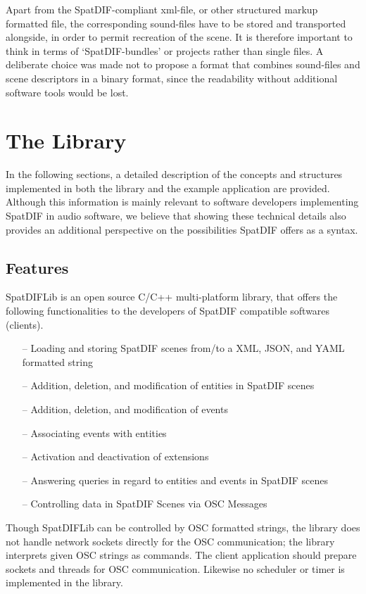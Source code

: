 \documentclass[a4paper]{article}
\begin{document}
Apart from the SpatDIF-compliant xml-file, or other structured markup formatted file, the corresponding sound-files have to be stored and transported alongside, in order to permit recreation of the scene.
It is therefore important to think in terms of `SpatDIF-bundles' or projects rather than single files.
A deliberate choice was made not to propose a format that combines sound-files and scene descriptors in a binary format, since the readability without additional software tools would be lost.

\section{The Library} %

In the following sections, a detailed description of the concepts and structures implemented in both the library and the example application are provided.
Although this information is mainly relevant to software developers implementing SpatDIF in audio software, we believe that showing these technical details also provides an additional perspective on the possibilities SpatDIF offers as a syntax.

\subsection{Features}
SpatDIFLib is an open source C/C++ multi-platform library, that offers the following functionalities to the developers of SpatDIF compatible softwares (clients).

\begin{itemize}[leftmargin=*]
\item[--] Loading and storing SpatDIF scenes from/to a XML, JSON, and YAML formatted string
\item[--] Addition, deletion, and modification of entities in SpatDIF scenes
\item[--] Addition, deletion, and modification of events
\item[--] Associating events with entities
\item[--] Activation and deactivation of extensions
\item[--] Answering queries in regard to entities and events in SpatDIF scenes
\item[--] Controlling data in SpatDIF Scenes via OSC Messages
\end{itemize}

Though SpatDIFLib can be controlled by OSC \cite{Wessel_2002, Schmeder_2008} formatted strings, the library does not handle network sockets directly for the OSC communication; the library interprets given OSC strings as commands. 
The client application should prepare sockets and threads for OSC communication. 
Likewise no scheduler or timer is implemented in the library. 
  
\end{document}
